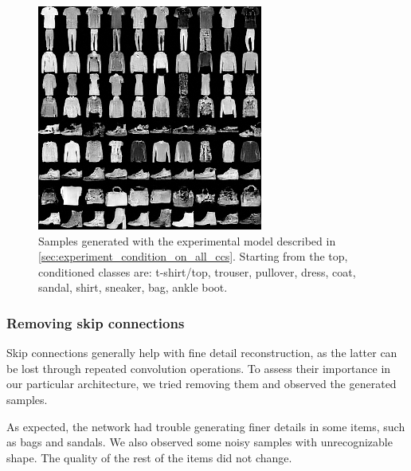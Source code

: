 \documentclass[final]{cvpr}
\begin{document}
\begin{figure}[t]
	\begin{center}
		\includegraphics[width=0.8\linewidth]{./figs/fashion_mnist/final_model_samples.png}
	\end{center}
	\caption{Samples generated with the experimental model described in \ref{sec:experiment_condition_on_all_ccs}. Starting from the top, conditioned classes are: t-shirt/top, trouser, pullover, dress, coat, sandal, shirt, sneaker, bag, ankle boot.}
	\label{fig:fashionmnist_final_model_samples}
\end{figure}

\subsubsection{Removing skip connections}
Skip connections generally help with fine detail reconstruction, as the latter can be lost through repeated convolution operations. To assess their importance in our particular architecture, we tried removing them and observed the generated samples.

As expected, the network had trouble generating finer details in some items, such as bags and sandals. We also observed some noisy samples with unrecognizable shape. The quality of the rest of the items did not change.
\end{document}
